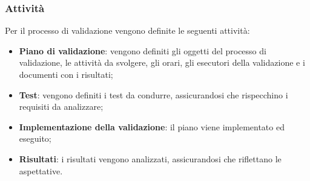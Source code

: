 	\subsubsection{Attività}
	Per il processo di validazione vengono definite le seguenti attività:
	\begin{itemize}
	    \item \textbf{Piano di validazione}: vengono definiti gli oggetti del processo di validazione, le attività da svolgere, gli orari, gli esecutori della validazione e i documenti con i risultati;
	    \item \textbf{Test}: vengono definiti i test da condurre, assicurandosi che rispecchino i requisiti da analizzare;
	    \item \textbf{Implementazione della validazione}: il piano viene implementato ed eseguito;
	    \item \textbf{Risultati}: i risultati vengono analizzati, assicurandosi che riflettano le aspettative.
	\end{itemize}

